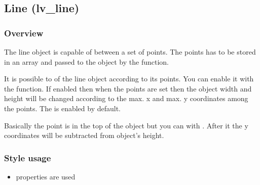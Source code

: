 \documentclass[letterpaper,10pt,english]{sphinxmanual}
\begin{document}
\begin{sphinxVerbatim}[commandchars=\\\{\}]
   
 
    
\end{sphinxVerbatim}


\subsection{Line (lv\_line)}
\label{\detokenize{object-types/line:line-lv-line}}\label{\detokenize{object-types/line::doc}}

\subsubsection{Overview}
\label{\detokenize{object-types/line:overview}}
The line object is capable of  between a set of points. The points has to be stored in an  array and passed to the object by the  function.

It is possible to  of the line object according to its points. You can enable it with the  function. If enabled then when the points are set then the object width and height will be changed according to the max. x and max. y coordinates among the points. The  is enabled by default.

Basically the  point is in the top of the object but you can  with . After it the y coordinates will be subtracted from object’s height.


\subsubsection{Style usage}
\label{\detokenize{object-types/line:style-usage}}\begin{itemize}
\item {} 
 properties are used

\end{itemize}
\end{document}
